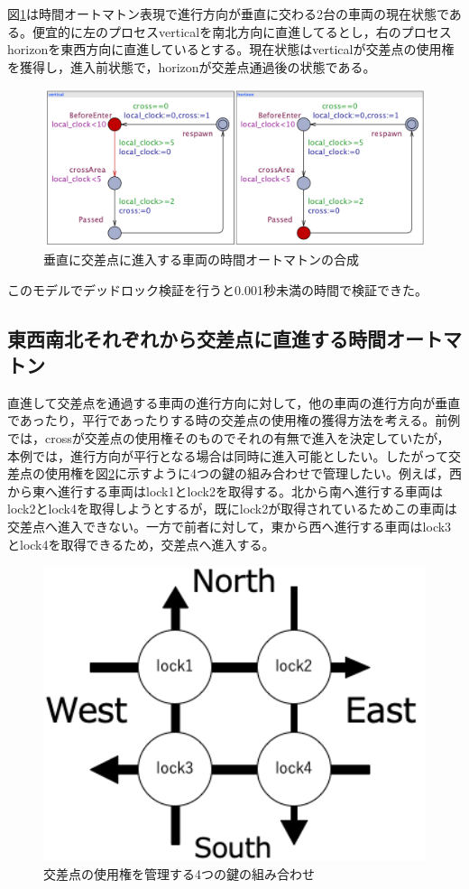 \documentclass{tpu-sotu}
\begin{document}
	図\ref{PerpendicularS}は時間オートマトン表現で進行方向が垂直に交わる2台の車両の現在状態である。便宜的に左のプロセスverticalを南北方向に直進してるとし，右のプロセスhorizonを東西方向に直進しているとする。現在状態はverticalが交差点の使用権を獲得し，進入前状態で，horizonが交差点通過後の状態である。
	\begin{figure}[htbp]
	\centering
	\includegraphics[width=130mm]{PerpendicularSimu.png}
	\caption{垂直に交差点に進入する車両の時間オートマトンの合成}
	\label{PerpendicularS}
	\end{figure}
	
	このモデルでデッドロック検証を行うと0.001秒未満の時間で検証できた。
	\newpage
	
	\subsection{東西南北それぞれから交差点に直進する時間オートマトン}
	直進して交差点を通過する車両の進行方向に対して，他の車両の進行方向が垂直であったり，平行であったりする時の交差点の使用権の獲得方法を考える。前例では，crossが交差点の使用権そのものでそれの有無で進入を決定していたが，本例では，進行方向が平行となる場合は同時に進入可能としたい。したがって交差点の使用権を図\ref{oTWoL}に示すように4つの鍵の組み合わせで管理したい。例えば，西から東へ進行する車両はlock1とlock2を取得する。北から南へ進行する車両はlock2とlock4を取得しようとするが，既にlock2が取得されているためこの車両は交差点へ進入できない。一方で前者に対して，東から西へ進行する車両はlock3とlock4を取得できるため，交差点へ進入する。
	\begin{figure}[htbp]
	\centering
	\includegraphics[width=130mm]{onTheWayofLock.png}
	\caption{交差点の使用権を管理する4つの鍵の組み合わせ}
	\label{oTWoL}
	\end{figure}
	
\end{document}
